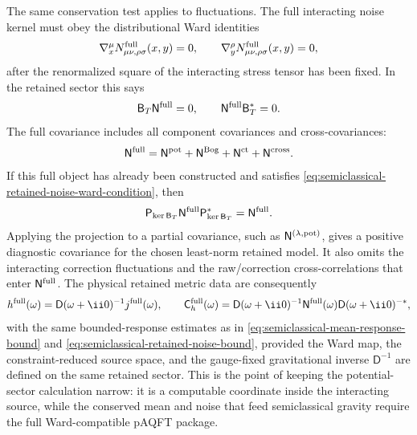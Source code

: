 The same conservation test applies to fluctuations.  The full interacting
noise kernel must obey the distributional Ward identities
\[
  \nabla_x^\mu N_{\mu\nu,\rho\sigma}^{\rm full}(x,y)=0,
  \qquad
  \nabla_y^\rho N_{\mu\nu,\rho\sigma}^{\rm full}(x,y)=0,
\]
after the renormalized square of the interacting stress tensor has been fixed.
In the retained sector this says
\begin{equation}
  \mathsf B_T\mathsf N^{\rm full}=0,
  \qquad
  \mathsf N^{\rm full}\mathsf B_T^*=0 .
  \label{eq:semiclassical-retained-noise-ward-condition}
\end{equation}
The full covariance includes all component covariances and cross-covariances:
\[
  \mathsf N^{\rm full}
  =
  \mathsf N^{\rm pot}
  +
  \mathsf N^{\rm Bog}
  +
  \mathsf N^{\rm ct}
  +
  \mathsf N^{\rm cross}.
\]
If this full object has already been constructed and satisfies
\eqref{eq:semiclassical-retained-noise-ward-condition}, then
\begin{equation}
  \mathsf P_{\ker \mathsf B_T}
  \mathsf N^{\rm full}
  \mathsf P_{\ker \mathsf B_T}^*
  =
  \mathsf N^{\rm full}.
  \label{eq:semiclassical-retained-noise-ward-projection}
\end{equation}
Applying the projection to a partial covariance, such as
\(\mathsf N^{(\lambda,{\rm pot})}\), gives a positive diagnostic covariance for
the chosen least-norm retained model.  It also omits the interacting correction
fluctuations and the raw/correction cross-correlations that enter
\(\mathsf N^{\rm full}\).  The physical retained metric data are consequently
\begin{equation}
  h^{\rm full}(\omega)
  =
  \mathsf D(\omega+\ii0)^{-1}j^{\rm full}(\omega),
  \qquad
  \mathsf C_h^{\rm full}(\omega)
  =
  \mathsf D(\omega+\ii0)^{-1}
  \mathsf N^{\rm full}(\omega)
  \mathsf D(\omega+\ii0)^{-*},
  \label{eq:semiclassical-ward-clean-response-data}
\end{equation}
with the same bounded-response estimates as in
\eqref{eq:semiclassical-mean-response-bound} and
\eqref{eq:semiclassical-retained-noise-bound}, provided the Ward map, the
constraint-reduced source space, and the gauge-fixed gravitational inverse
\(\mathsf D^{-1}\) are defined on the same retained sector.  This is the point
of keeping the potential-sector calculation narrow: it is a computable
coordinate inside the interacting source, while the conserved mean and noise
that feed semiclassical gravity require the full Ward-compatible pAQFT package.

